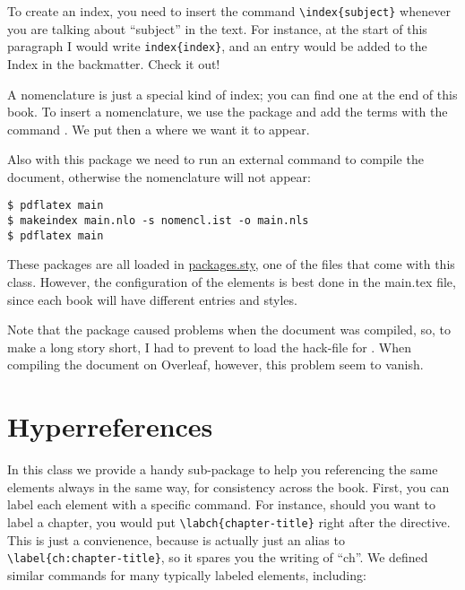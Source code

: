 To create an index, you need to insert the command 
\lstinline|\index{subject}| whenever you are talking about 
\enquote{subject} in the text. For instance, at the start of this 
paragraph I would write \lstinline|index{index}|, and an entry would be 
added to the Index in the backmatter. Check it out!


A nomenclature is just a special kind of index; you can find one at the end of
this book. To insert a nomenclature, we use the package  and
add the terms with the command . We put then a
 where we want it to appear.

Also with this package we need to run an external command to compile the 
document, otherwise the nomenclature will not appear:

\begin{lstlisting}[style=kaolstplain]
$ pdflatex main
$ makeindex main.nlo -s nomencl.ist -o main.nls
$ pdflatex main
\end{lstlisting}

These packages are all loaded in 
\href{style/packages.sty}{packages.sty}, one of the files that come with 
this class. However, the configuration of the elements is best done in 
the main.tex file, since each book will have different entries and 
styles.

Note that the  package caused problems when the 
document was compiled, so, to make a long story short, I had to prevent 
 to load the hack-file for . When 
compiling the document on Overleaf, however, this problem seem to 
vanish.


\section{Hyperreferences}

In this class we provide a handy sub-package to help you referencing the 
same elements always in the same way, for consistency across the book. 
First, you can label each element with a specific command. For instance, 
should you want to label a chapter, you would put 
\lstinline|\labch{chapter-title}| right after the  
directive. This is just a convienence, because  is 
actually just an alias to \lstinline|\label{ch:chapter-title}|, so it 
spares you the writing of \enquote{ch}. We defined similar commands for 
many typically labeled elements, including:

